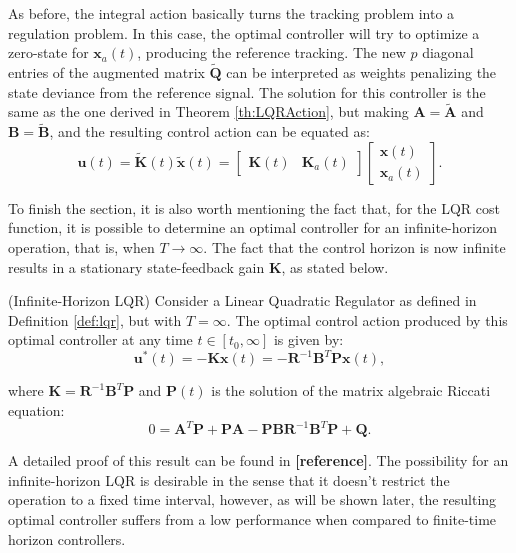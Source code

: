 \documentclass[a4paper,11pt]{book}
\numberwithin{figure}{chapter}
\numberwithin{equation}{chapter}
\numberwithin{table}{chapter}
\newtheorem{theorem}{Theorem}[chapter]
\theoremstyle{definition}
\newcounter{boxed-theorem}
\newenvironment{boxed-theorem}[1]
{\begin{shaded} \begin{theorem}{#1}}
{\end{theorem} \end{shaded}}
\newcounter{boxed-definition}
\begin{document}
As before, the integral action basically turns the tracking problem into a regulation problem. In this case, the optimal controller will try to optimize a zero-state for $\bm{x}_a(t)$, producing the reference tracking. The new $p$ diagonal entries of the augmented matrix $\tilde{\bm{Q}}$ can be interpreted as weights penalizing the state deviance from the reference signal. The solution for this controller is the same as the one derived in Theorem \ref{th:LQRAction}, but making $\bm{A} = \tilde{\bm{A}}$ and $\bm{B} = \tilde{\bm{B}}$, and the resulting control action can be equated as:
\begin{equation}
    \bm{u}(t) = \tilde{\bm{K}}(t)\tilde{\bm{x}}(t) = \begin{bmatrix} \bm{K}(t) & \bm{K}_a(t) \end{bmatrix} \begin{bmatrix} \bm{x}(t) \\ \bm{x}_a(t) \end{bmatrix}
.\end{equation}

To finish the section, it is also worth mentioning the fact that, for the LQR cost function, it is possible to determine an optimal controller for an infinite-horizon operation, that is, when $T \to \infty$. The fact that the control horizon is now infinite results in a stationary state-feedback gain $\bm{K}$, as stated below.

\begin{boxed-theorem}{(Infinite-Horizon LQR)} \label{th:infiniteLQR}
    Consider a Linear Quadratic Regulator as defined in Definition \ref{def:lqr}, but with $T = \infty$. The optimal control action produced by this optimal controller at any time $t \in [t_0, \infty]$ is given by:
    \begin{equation}
        \bm{u}^*(t) = - \bm{K} \bm{x}(t) = - \bm{R}^{-1} \bm{B}^T \bm{P} \bm{x}(t)
    ,\end{equation}
    
    \noindent where $\bm{K} = \bm{R}^{-1} \bm{B}^T \bm{P}$ and $\bm{P}(t)$ is the solution of the matrix algebraic Riccati equation:
    \begin{equation}
        0 = \bm{A}^T \bm{P} + \bm{P} \bm{A} - \bm{P} \bm{B} \bm{R}^{-1} \bm{B}^T \bm{P} + \bm{Q}
    .\end{equation}
\end{boxed-theorem}

A detailed proof of this result can be found in \textbf{[reference]}. The possibility for an infinite-horizon LQR is desirable in the sense that it doesn't restrict the operation to a fixed time interval, however, as will be shown later, the resulting optimal controller suffers from a low performance when compared to finite-time horizon controllers.
\end{document}
